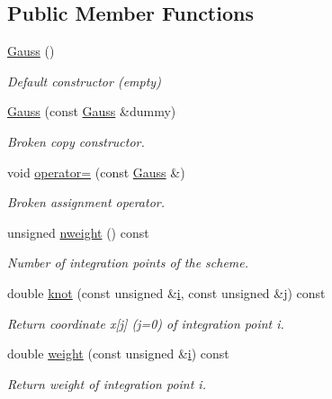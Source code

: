 \subsection*{Public Member Functions}
\begin{DoxyCompactItemize}
\item 
\hyperlink{classoomph_1_1Gauss_3_011_00_014_01_4_a7dde7d86132c98e27e88fec102a4b02c}{Gauss} ()
\begin{DoxyCompactList}\small\item\em Default constructor (empty) \end{DoxyCompactList}\item 
\hyperlink{classoomph_1_1Gauss_3_011_00_014_01_4_a1feee2756c748934ebc8637797e664f7}{Gauss} (const \hyperlink{classoomph_1_1Gauss}{Gauss} \&dummy)
\begin{DoxyCompactList}\small\item\em Broken copy constructor. \end{DoxyCompactList}\item 
void \hyperlink{classoomph_1_1Gauss_3_011_00_014_01_4_ad3cfca76fefa1ecde1b1248ab9bde15e}{operator=} (const \hyperlink{classoomph_1_1Gauss}{Gauss} \&)
\begin{DoxyCompactList}\small\item\em Broken assignment operator. \end{DoxyCompactList}\item 
unsigned \hyperlink{classoomph_1_1Gauss_3_011_00_014_01_4_a25cfa5afbd5ac60332263a72374aef8a}{nweight} () const
\begin{DoxyCompactList}\small\item\em Number of integration points of the scheme. \end{DoxyCompactList}\item 
double \hyperlink{classoomph_1_1Gauss_3_011_00_014_01_4_a8b87ea81fe0a064ea5fecf1c2a20a942}{knot} (const unsigned \&\hyperlink{cfortran_8h_adb50e893b86b3e55e751a42eab3cba82}{i}, const unsigned \&j) const
\begin{DoxyCompactList}\small\item\em Return coordinate x\mbox{[}j\mbox{]} (j=0) of integration point i. \end{DoxyCompactList}\item 
double \hyperlink{classoomph_1_1Gauss_3_011_00_014_01_4_a528ff3a23fb367ead8a5088142fb8828}{weight} (const unsigned \&\hyperlink{cfortran_8h_adb50e893b86b3e55e751a42eab3cba82}{i}) const
\begin{DoxyCompactList}\small\item\em Return weight of integration point i. \end{DoxyCompactList}\end{DoxyCompactItemize}
